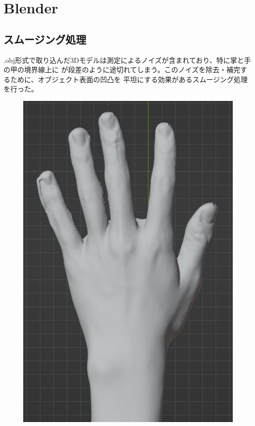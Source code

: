 \documentclass{ltjsreport}
\begin{document}
	\section{Blender}
		\subsection{スムージング処理}
			.obj形式で取り込んだ3Dモデルは測定によるノイズが含まれており、特に掌と手の甲の境界線上に
			が段差のように途切れてしまう。このノイズを除去・補完するために、オブジェクト表面の凹凸を
			平坦にする効果があるスムージング処理を行った。
			\begin{figure}[H]
			\centering
			\begin{minipage}{0.3\columnwidth}
			\centering
			\includegraphics[width = \columnwidth]{../figs/SmoothingBeforRear.png}

\end{minipage}
\end{figure}
\end{document}
